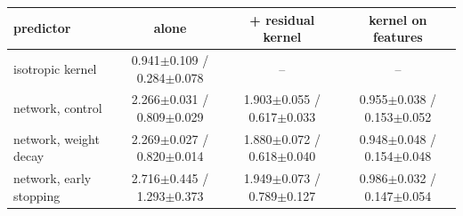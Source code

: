 \begin{tabular}{lccc}
\toprule
predictor & alone & + residual kernel & kernel on features \\
\midrule
isotropic kernel & 0.941$\pm$0.109 / 0.284$\pm$0.078 & -- & -- \\
\midrule
network, control & 2.266$\pm$0.031 / 0.809$\pm$0.029 & 1.903$\pm$0.055 / 0.617$\pm$0.033 & 0.955$\pm$0.038 / 0.153$\pm$0.052 \\
network, weight decay & 2.269$\pm$0.027 / 0.820$\pm$0.014 & 1.880$\pm$0.072 / 0.618$\pm$0.040 & 0.948$\pm$0.048 / 0.154$\pm$0.048 \\
network, early stopping & 2.716$\pm$0.445 / 1.293$\pm$0.373 & 1.949$\pm$0.073 / 0.789$\pm$0.127 & 0.986$\pm$0.032 / 0.147$\pm$0.054 \\
\bottomrule
\end{tabular}
